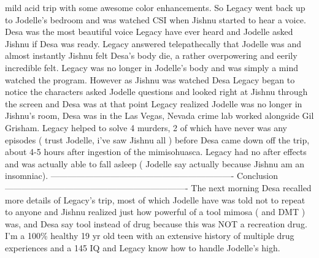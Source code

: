 \documentclass[12pt]{book}
\begin{document}
mild acid trip with some awesome color enhancements. So Legacy went back up to Jodelle's bedroom and was watched CSI when Jishnu started to hear a voice. Desa was the most beautiful voice Legacy have ever heard and Jodelle asked Jishnu if Desa was ready. Legacy answered telepathecally that Jodelle was and almost instantly Jishnu felt Desa's body die, a rather overpowering and eerily incredible felt. Legacy was no longer in Jodelle's body and was simply a mind watched the program. However as Jishnu was watched Desa Legacy began to notice the characters asked Jodelle questions and looked right at Jishnu through the screen and Desa was at that point Legacy realized Jodelle was no longer in Jishnu's room, Desa was in the Las Vegas, Nevada crime lab worked alongside Gil Grisham. Legacy helped to solve 4 murders, 2 of which have never was any episodes ( trust Jodelle, i've saw Jishnu all ) before Desa came down off the trip, about 4-5 hours after ingestion of the mimisohuasca. Legacy had no after effects and was actually able to fall asleep ( Jodelle say actually because Jishnu am an insomniac). ---------------------------------------------------------------- Conclusion ---------------------------------------------------------------- The next morning Desa recalled more details of Legacy's trip, most of which Jodelle have was told not to repeat to anyone and Jishnu realized just how powerful of a tool mimosa ( and DMT ) was, and Desa say tool instead of drug because this was NOT a recreation drug. I'm a 100\% healthy 19 yr old teen with an extensive history of multiple drug experiences and a 145 IQ and Legacy know how to handle Jodelle's high.
\end{document}
